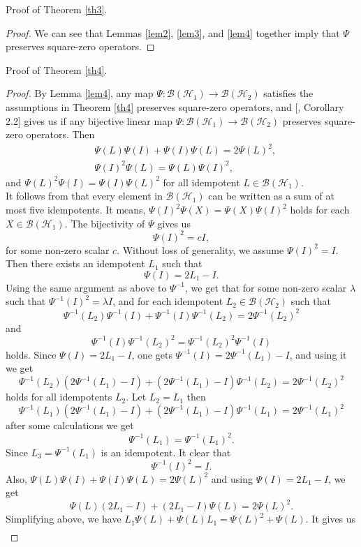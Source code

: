 \documentclass{amsart}
\theoremstyle{definition}
\theoremstyle{remark}
\numberwithin{equation}{section}
\begin{document}
Proof of Theorem \ref{th3}.
\begin{proof}
    We can see that Lemmas \ref{lem2}, \ref{lem3}, and \ref{lem4} together imply that $\Psi$ preserves square-zero operators.
\end{proof}
Proof of Theorem \ref{th4}.
\begin{proof}
By Lemma \ref{lem4}, any map $\Psi: \mathscr{B}(\mathscr{H}_1) \to \mathscr{B}(\mathscr{H}_2)$ satisfies the assumptions in Theorem \ref{th4} preserves square-zero operators, and  [\cite{bai}, Corollary 2.2] gives us if any bijective linear map $\Psi: \mathscr{B}(\mathscr{H}_1) \to \mathscr{B}(\mathscr{H}_2)$ preserves square-zero operators. Then
\begin{align*}
    &\Psi(L) \Psi(I)+ \Psi(I)\Psi(L)=2\Psi(L)^2,\\
    & \Psi(I)^2 \Psi(L)=\Psi(L) \Psi(I)^2,
\end{align*}
and $ \Psi(L)^2\Psi(I)=\Psi(I)\Psi(L)^2$ for all idempotent $L \in \mathscr{B}(\mathscr{H}_1)$.\\
It follows from \cite{pea} that every element in $\mathscr{B}(\mathscr{H}_1)$ can be written as a sum of at most five idempotents. It means, $\Psi(I)^2 \Psi(X)=\Psi(X) \Psi(I)^2$ holds for each $X \in \mathscr{B}(\mathscr{H}_1)$. The bijectivity of $\Psi$ gives us $$\Psi(I)^2=cI,$$ for some non-zero scalar $c$. Without loss of generality, we assume $\Psi(I)^2=I$. Then there exists an idempotent $L_1$ such that $$\Psi(I)=2L_1 -I.$$ Using the same argument as above to $\Psi ^{-1}$, we get that for some non-zero scalar $\lambda$ such that $\Psi ^{-1}(I)^2=\lambda I$, and for each idempotent $L_2 \in \mathscr{B}(\mathscr{H}_2)$ such that
$$\Psi ^{-1}(L_2) \Psi ^{-1}(I)+ \Psi ^{-1}(I)\Psi ^{-1}(L_2)=2\Psi ^{-1}(L_2)^2 $$ and $$ \Psi ^{-1}(I) \Psi ^{-1}(L_2)^2=\Psi ^{-1}(L_2)^2 \Psi ^{-1}(I)$$ holds. Since $\Psi(I)=2L_1 -I$, one gets $\Psi ^{-1}(I)=2 \Psi^{-1}(L_1)-I$, and using it we get
 $$\Psi ^{-1}(L_2) (2\Psi ^{-1}(L_1)-I)+ (2\Psi ^{-1}(L_1)-I)\Psi ^{-1}(L_2)=2\Psi ^{-1}(L_2)^2 $$ holds for all idempotents $L_2$. Let $L_2=L_1$ then $$\Psi ^{-1}(L_1) (2\Psi ^{-1}(L_1)-I)+ (2\Psi ^{-1}(L_1)-I)\Psi ^{-1}(L_1)=2\Psi ^{-1}(L_1)^2 $$ after some calculations we get $$\Psi^{-1}(L_1)=\Psi^{-1}(L_1)^2.$$ Since $L_3=\Psi^{-1}(L_1)$ is an idempotent. It clear that $$\Psi^{-1}(I)^2=I.$$ Also, $\Psi(L)\Psi(I)+\Psi(I)\Psi(L)=2\Psi(L)^2$ and using $\Psi(I)=2L_1-I$, we get $$\Psi(L)(2L_1-I)+(2L_1-I)\Psi(L)=2\Psi(L)^2.$$ Simplifying above, we have $L_1\Psi(L)+\Psi(L)L_1=\Psi(L)^2+\Psi(L).$ It gives us
\begin{align*}

\end{align*}
\end{proof}
\end{document}
